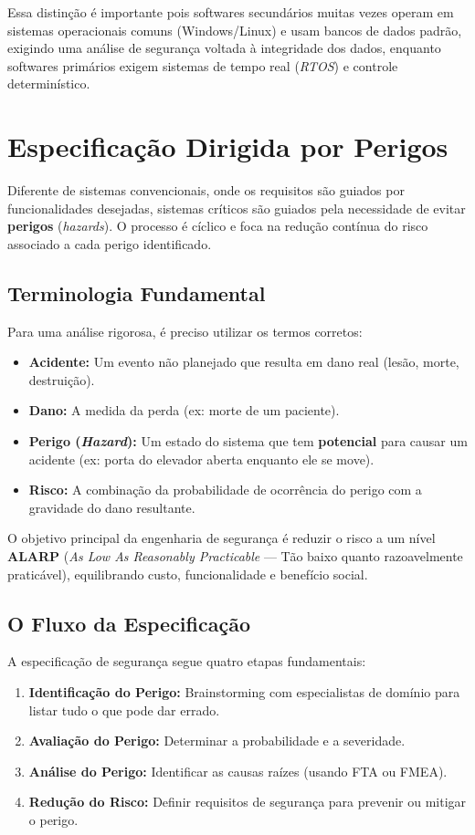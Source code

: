 \documentclass[12pt,a4paper]{report}
\begin{document}
Essa distinção é importante pois softwares secundários muitas vezes operam em sistemas operacionais comuns (Windows/Linux) e usam bancos de dados padrão, exigindo uma análise de segurança voltada à integridade dos dados, enquanto softwares primários exigem sistemas de tempo real (\emph{RTOS}) e controle determinístico.

\section{Especificação Dirigida por Perigos}

Diferente de sistemas convencionais, onde os requisitos são guiados por funcionalidades desejadas, sistemas críticos são guiados pela necessidade de evitar \textbf{perigos} (\emph{hazards}). O processo é cíclico e foca na redução contínua do risco associado a cada perigo identificado.

\subsection{Terminologia Fundamental}
Para uma análise rigorosa, é preciso utilizar os termos corretos:
\begin{itemize}
    \item \textbf{Acidente:} Um evento não planejado que resulta em dano real (lesão, morte, destruição).
    \item \textbf{Dano:} A medida da perda (ex: morte de um paciente).
    \item \textbf{Perigo (\textit{Hazard}):} Um estado do sistema que tem \textbf{potencial} para causar um acidente (ex: porta do elevador aberta enquanto ele se move).
    \item \textbf{Risco:} A combinação da probabilidade de ocorrência do perigo com a gravidade do dano resultante.
\end{itemize}

O objetivo principal da engenharia de segurança é reduzir o risco a um nível \textbf{ALARP} (\emph{As Low As Reasonably Practicable} --- Tão baixo quanto razoavelmente praticável), equilibrando custo, funcionalidade e benefício social.

\subsection{O Fluxo da Especificação}
A especificação de segurança segue quatro etapas fundamentais:

\begin{enumerate}
    \item \textbf{Identificação do Perigo:} Brainstorming com especialistas de domínio para listar tudo o que pode dar errado.
    \item \textbf{Avaliação do Perigo:} Determinar a probabilidade e a severidade.
    \item \textbf{Análise do Perigo:} Identificar as causas raízes (usando FTA ou FMEA).
    \item \textbf{Redução do Risco:} Definir requisitos de segurança para prevenir ou mitigar o perigo.
\end{enumerate}
\end{document}
